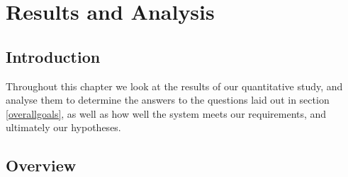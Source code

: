 \chapter{Results and Analysis}

\section{Introduction}
Throughout this chapter we look at the results of our quantitative study, and analyse them to determine the answers to the questions laid out in section \ref{overallgoals}, as well as how well the system meets our requirements, and ultimately our hypotheses. 

\section{Overview}
